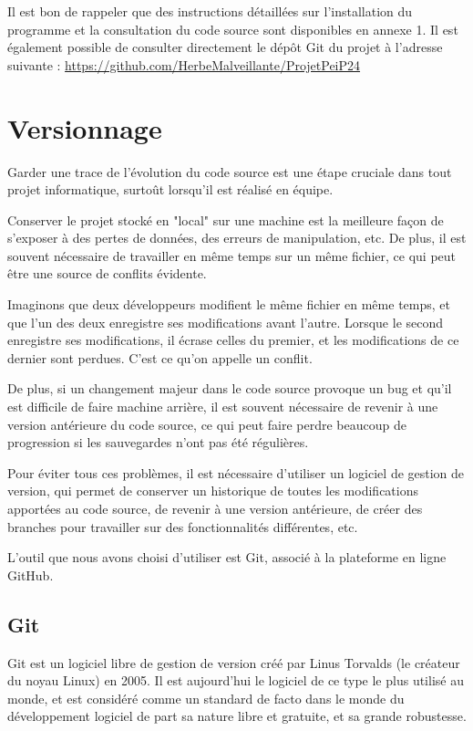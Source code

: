 \documentclass[12pt]{scrreprt} %
\begin{document}
Il est bon de rappeler que des instructions détaillées sur l'installation du programme et la consultation du code source sont disponibles en annexe 1. Il est également possible de consulter directement le dépôt Git du projet à l'adresse suivante : \url{https://github.com/HerbeMalveillante/ProjetPeiP24}

\section{Versionnage}

Garder une trace de l'évolution du code source est une étape cruciale dans tout projet informatique, surtoût lorsqu'il est réalisé en équipe.

Conserver le projet stocké en "local" sur une machine est la meilleure façon de s'exposer à des pertes de données, des erreurs de manipulation, etc. De plus, il est souvent nécessaire de travailler en même temps sur un même fichier, ce qui peut être une source de conflits évidente.

Imaginons que deux développeurs modifient le même fichier en même temps, et que l'un des deux enregistre ses modifications avant l'autre. Lorsque le second enregistre ses modifications, il écrase celles du premier, et les modifications de ce dernier sont perdues. C'est ce qu'on appelle un conflit.

De plus, si un changement majeur dans le code source provoque un bug et qu'il est difficile de faire machine arrière, il est souvent nécessaire de revenir à une version antérieure du code source, ce qui peut faire perdre beaucoup de progression si les sauvegardes n'ont pas été régulières.

Pour éviter tous ces problèmes, il est nécessaire d'utiliser un logiciel de gestion de version, qui permet de conserver un historique de toutes les modifications apportées au code source, de revenir à une version antérieure, de créer des branches pour travailler sur des fonctionnalités différentes, etc.

L'outil que nous avons choisi d'utiliser est Git\cite{Git2024}, associé à la plateforme en ligne GitHub\cite{GitHub2024}.

\subsection{Git}

Git est un logiciel libre de gestion de version créé par Linus Torvalds (le créateur du noyau Linux) en 2005. Il est aujourd'hui le logiciel de ce type le plus utilisé au monde, et est considéré comme un standard de facto dans le monde du développement logiciel de part sa nature libre et gratuite, et sa grande robustesse.
\end{document}
